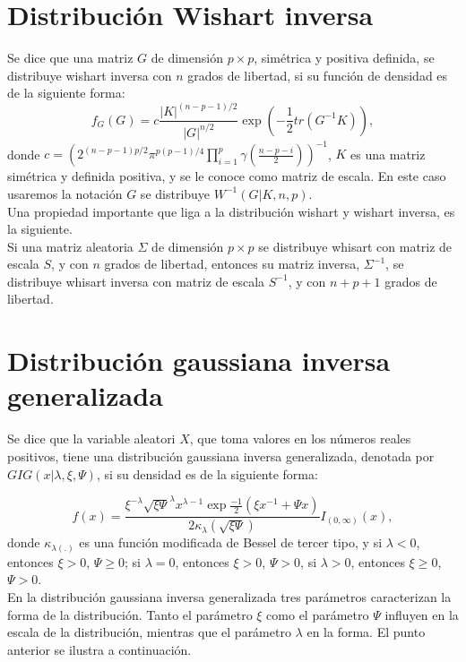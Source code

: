\section{Distribución Wishart inversa}
Se dice que una matriz $G$ de dimensión $p \times p$, simétrica y positiva definida, se distribuye wishart inversa con $n$ grados de libertad, si su función de densidad es de la siguiente forma:
\begin{equation*}
	f_{G}(G)=c\frac{|K|^{(n-p-1)/2}}{|G|^{n/2}}\exp(-\frac{1}{2}tr(G^{-1}K)),
\end{equation*}
donde $c=\left(2^{(n-p-1)p/2}\pi^{p(p-1)/4}\prod_{i=1}^{p}\gamma(\frac{n-p-i}{2})\right)^{-1}$, $K$ es una matriz simétrica y definida positiva, y se le conoce como matriz de escala. En este caso usaremos la notación $G$ se distribuye $W^{-1}(G|K,n,p)$.\\

Una propiedad importante que liga a la distribución wishart y wishart inversa, es la siguiente.\\ 

Si una matriz aleatoria $\Sigma$ de dimensión $p\times p$ se distribuye whisart con matriz de escala $S$, y con $n$ grados de libertad, entonces su matriz inversa, $\Sigma^{-1}$, se distribuye whisart inversa con matriz de escala $S^{-1}$, y con $n+p+1$ grados de libertad.

\section{Distribución gaussiana inversa generalizada}
Se dice que la variable aleatori $X$, que toma valores en los números reales positivos, tiene una distribución gaussiana inversa generalizada, denotada por $GIG(x|\lambda,\xi,\Psi)$, si su densidad es de la siguiente forma:

\begin{equation*}
	f(x)= \dfrac{\xi^{-\lambda}\sqrt{\xi\Psi}^{\lambda}x^{\lambda-1}\exp{\frac{-1}{2}(\xi x^{-1} + \Psi x)}}{2\kappa_{\lambda}(\sqrt{\xi\Psi})}I_{(0,\infty)}(x),  
\end{equation*}
donde $\kappa_{\lambda(.)}$ es una función modificada de Bessel de tercer tipo, y si $\lambda<0$, entonces $\xi>0$, $\Psi \ge 0 $; si $\lambda=0$, entonces $\xi>0$, $\Psi > 0 $, si $\lambda>0$, entonces $\xi\ge 0$, $\Psi > 0 $.\\

En la distribución gaussiana inversa generalizada tres parámetros caracterizan la forma de la distribución. Tanto el parámetro $\xi$ como el parámetro $\Psi$ influyen en la escala de la distribución, mientras que el parámetro $\lambda$ en la forma. El punto anterior se ilustra a continuación.\\

